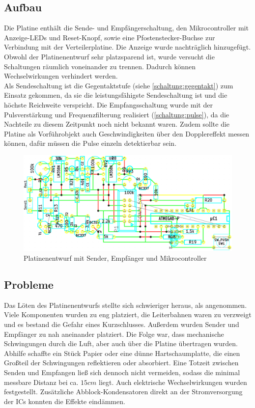 \subsection{Aufbau}
Die Platine enthält die Sende- und Empfängerschaltung, den Mikrocontroller mit Anzeige-LEDs und Reset-Knopf, sowie eine Pfostenstecker-Buchse zur Verbindung mit der Verteilerplatine. Die Anzeige wurde nachträglich hinzugefügt. Obwohl der Platinenentwurf sehr platzsparend ist, wurde versucht die Schaltungen räumlich voneinander zu trennen. Dadurch können Wechselwirkungen verhindert werden.\\
Als Sendeschaltung ist die Gegentaktstufe (siehe \ref{schaltung:gegentakt}) zum Einsatz gekommen, da sie die leistungsfähigste Sendeschaltung ist und die höchste Reichweite verspricht. Die Empfangsschaltung wurde mit der Pulsverstärkung und Frequenzfilterung realisiert (\ref{schaltung:pulse}), da die Nachteile zu diesem Zeitpunkt noch nicht bekannt waren. Zudem sollte die Platine als Vorführobjekt auch Geschwindigkeiten über den Dopplereffekt messen können, dafür müssen die Pulse einzeln detektierbar sein.

\begin{figure}[H]
	\centering
	\includegraphics[width=(\textwidth)]{images/prototyp_2d.png}
	\caption{Platinenentwurf mit Sender, Empfänger und Mikrocontroller} \label{img:prototyp2d}
\end{figure}

\subsection{Probleme}
Das Löten des Platinenentwurfs stellte sich schwieriger heraus, als angenommen. Viele Komponenten wurden zu eng platziert, die Leiterbahnen waren zu verzweigt und es bestand die Gefahr eines Kurzschlusses. Außerdem wurden Sender und Empfänger zu nah aneinander platziert. Die Folge war, dass mechanische Schwingungen durch die Luft, aber auch über die Platine übertragen wurden. Abhilfe schaffte ein Stück Papier oder eine dünne Hartschaumplatte, die einen Großteil der Schwingungen reflektieren oder absorbiert. Eine Totzeit zwischen Senden und Empfangen ließ sich dennoch nicht vermeiden, sodass die minimal messbare Distanz bei ca. $15cm$ liegt. Auch elektrische Wechselwirkungen wurden festgestellt. Zusätzliche Abblock-Kondensatoren direkt an der Stromversorgung der ICs konnten die Effekte eindämmen.


